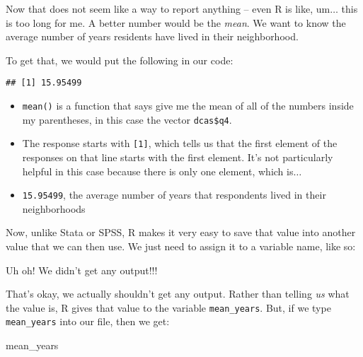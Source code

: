 \documentclass[]{article}
\newenvironment{Shaded}{\begin{snugshade}}{\end{snugshade}}
\newcommand{\KeywordTok}[1]{\textcolor[rgb]{0.13,0.29,0.53}{\textbf{{#1}}}}
\newcommand{\StringTok}[1]{\textcolor[rgb]{0.31,0.60,0.02}{{#1}}}
\newcommand{\NormalTok}[1]{{#1}}
\begin{document}
Now that does not seem like a way to report anything -- even R is like,
um\(\ldots\) this is too long for me. A better number would be the
\emph{mean}. We want to know the average number of years residents have
lived in their neighborhood.

To get that, we would put the following in our code:

\begin{Shaded}
\end{Shaded}

\begin{verbatim}
## [1] 15.95499
\end{verbatim}

\begin{itemize}
\item
  {\texttt{mean()}} is a function that says give me the mean of all of
  the numbers inside my parentheses, in this case the vector
  {\texttt{dcas\$q4}}.
\item
  The response starts with {\texttt{{[}1{]}}}, which tells us that the
  first element of the responses on that line starts with the first
  element. It's not particularly helpful in this case because there is
  only one element, which is\(\ldots\)
\item
  {\texttt{15.95499}}, the average number of years that respondents
  lived in their neighborhoods
\end{itemize}

Now, unlike Stata or SPSS, R makes it very easy to save that value into
another value that we can then use. We just need to assign it to a
variable name, like so:

\begin{Shaded}
\end{Shaded}

Uh oh! We didn't get any output!!!

That's okay, we actually shouldn't get any output. Rather than telling
\emph{us} what the value is, R gives that value to the variable
\texttt{mean\_years}. But, if we type \texttt{mean\_years} into our
file, then we get:

\begin{Shaded}
\begin{Highlighting}[]
\NormalTok{mean_years}
\end{Highlighting}
\end{Shaded}
\end{document}
